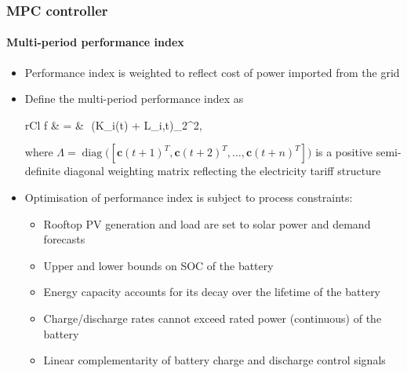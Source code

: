 \documentclass[handout, smaller, xcolor=table]{beamer}			%
\newcommand{\sqrts}[2][]{\,\sqrt[#1]{#2}\,}
\begin{document}
\begin{frame}
	\frametitle{MPC controller}
	\framesubtitle{Multi-period performance index}

	\begin{itemize}
		\item  Performance index is weighted to reflect cost of power imported from the grid
		\item  Define the multi-period performance index as
		\begin{IEEEeqnarray*}{rCl}
				f & = & \left\lVert\sqrts{\Lambda}\big(K_{i}(t) + L_{i,t}\big)\right\rVert_{2}^{2},
		\end{IEEEeqnarray*}
		where $\Lambda = \operatorname{diag}\big([\boldsymbol{c}(t\!+\!1)^{T}, \boldsymbol{c}(t\!+\!2)^{T}, \ldots, \boldsymbol{c}(t\!+\!n)^{T}]\big)$ is a positive semi-definite diagonal weighting matrix reflecting the electricity tariff structure
		
		\item  Optimisation of performance index is subject to process constraints:
		\begin{itemize}
			\item  Rooftop PV generation and load are set to solar power and demand forecasts%
			\item  Upper and lower bounds on SOC of the battery%
			\item  Energy capacity accounts for its decay over the lifetime of the battery
			\item  Charge/discharge rates cannot exceed rated power (continuous) of the battery
			\item  Linear complementarity of battery charge and discharge control signals
		\end{itemize}
		
	\end{itemize}

\end{frame}
\end{document}
